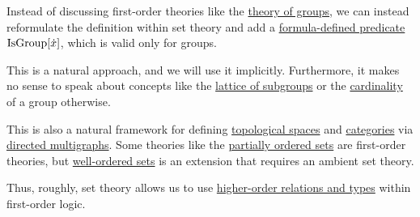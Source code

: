 \begin{remark}\label{rem:first_order_theories_in_zfc}
  Instead of discussing first-order theories like the \hyperref[def:group/theory]{theory of groups}, we can instead reformulate the definition within set theory and add a \hyperref[con:formula_defined_predicate]{formula-defined predicate} \( \op{IsGroup}[\synx] \), which is valid only for groups.

  This is a natural approach, and we will use it implicitly. Furthermore, it makes no sense to speak about concepts like the \hyperref[thm:substructures_form_complete_lattice]{lattice of subgroups} or the \hyperref[def:cardinal]{cardinality} of a group otherwise.

  This is also a natural framework for defining \hyperref[def:topological_space]{topological spaces} and \hyperref[def:category]{categories} via \hyperref[def:directed_multigraph]{directed multigraphs}. Some theories like the \hyperref[def:partially_ordered_set]{partially ordered sets} are first-order theories, but \hyperref[def:well_ordered_set]{well-ordered sets} is an extension that requires an ambient set theory.

  Thus, roughly, set theory allows us to use \hyperref[def:higher_order_logic]{higher-order relations and types} within first-order logic.
\end{remark}
